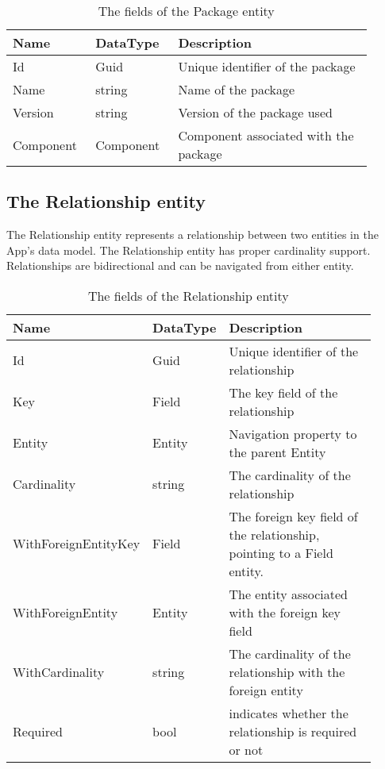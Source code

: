 \begin{table}[H]
\small
\begin{tabular}{ p{0.20\linewidth} p{0.20\linewidth} p{0.50\linewidth} }
\hline
\textbf{Name} & \textbf{DataType} & \textbf{Description} \\
\hline
Id & Guid & Unique identifier of the package \\
Name & string & Name of the package \\
Version & string & Version of the package used \\
Component & Component & Component associated with the package \\
\hline
\end{tabular}
\caption{The fields of the Package entity}
\label{table:package_entity}
\end{table}

\subsection{The Relationship entity}

The Relationship entity represents a relationship between two entities in the App's data
model. The Relationship entity has proper cardinality support. Relationships are
bidirectional and can be navigated from either entity.

\begin{table}[H]
\small
\begin{tabular}{ p{0.24\linewidth} p{0.12\linewidth} p{0.55\linewidth} }
\hline
\textbf{Name} & \textbf{DataType} & \textbf{Description} \\
\hline
Id & Guid & Unique identifier of the relationship \\
Key & Field & The key field of the relationship \\
Entity & Entity & Navigation property to the parent Entity \\
Cardinality & string & The cardinality of the relationship \\
WithForeignEntityKey & Field & The foreign key field of the relationship, pointing to a
Field entity. \\
WithForeignEntity & Entity & The entity associated with the foreign key field \\
WithCardinality & string & The cardinality of the relationship with the foreign entity \\
Required & bool & indicates whether the relationship is required or not \\
\hline
\end{tabular}
\caption{The fields of the Relationship entity}
\label{table:relationship_entity}
\end{table}